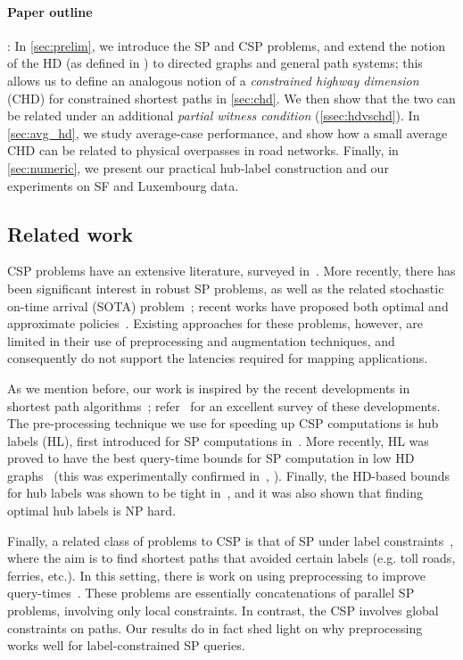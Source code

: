 \paragraph{Paper outline}:
In \cref{sec:prelim}, we introduce the SP and CSP problems, and extend the notion of the HD (as defined in \citep{highway2013}) to directed graphs and general path systems; this allows us to define an analogous notion of a \emph{constrained highway dimension} (CHD) for constrained shortest paths in \cref{sec:chd}. 
We then show that the two can be related under an additional \emph{partial witness condition} (\cref{ssec:hdvschd}). 
In \cref{sec:avg_hd}, we study average-case performance, and show how a small average CHD can be related to physical overpasses in road networks. 
Finally, in \cref{sec:numeric}, we present our practical hub-label construction and our experiments on SF and Luxembourg data.


\subsection{Related work}

CSP problems have an extensive literature, surveyed in~\citep{csp_survey}. 
More recently, there has been significant interest in robust SP problems, as well as the related stochastic on-time arrival (SOTA) problem~\citep{fan2005arriving}; recent works have proposed both optimal and approximate policies~\citep{sabran2014precomputation,nikolova_discretization}. 
Existing approaches for these problems, however, are limited in their use of preprocessing and augmentation techniques, and consequently do not support the latencies required for mapping applications.

As we mention before, our work is inspired by the recent developments in shortest path algorithms~\citep{highway2013,hubimplem,highway2010,dimacs09,geisberger_ch_definition,skeleton}; refer~\citep{goldberg_survey} for an excellent survey of these developments. 
The pre-processing technique we use for speeding up CSP computations is hub labels (HL), first introduced for SP computations in~\citep{cohen_definition_hl}. 
More recently, HL was proved to have the best query-time bounds for SP computation in low HD graphs~\citep{highway2013,highway2010} (this was experimentally confirmed in~\citep{hubimplem}, \cite[Figure 7]{goldberg_survey}).  
Finally, the HD-based bounds for hub labels was shown to be tight in~\citep{babenko_hl_complexity,white_complexity_hd}, and it was also shown that finding optimal hub labels is NP hard.

Finally, a related class of problems to CSP is that of SP under label constraints~\citep{language_csp}, where the aim is to find shortest paths that avoided certain labels (e.g. toll roads, ferries, etc.). 
In this setting, there is work on using preprocessing to improve query-times~\citep{rice_csp}.
These problems are essentially concatenations of parallel SP problems, involving only local constraints. 
In contrast, the CSP involves global constraints on paths.
Our results do in fact shed light on why preprocessing works well for label-constrained SP queries.